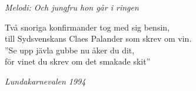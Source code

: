 {\footnotesize\textit{Melodi: Och jungfru hon går i ringen}}\par
\vspace{10pt}
Två snoriga konfirmander tog med sig bensin,\\
till Sydsvenskans Claes Palander som skrev om vin.\\
”Se upp jävla gubbe nu åker du dit,\\
för vinet du skrev om det smakade skit”\par
\vspace{10pt}
{\footnotesize\textit{Lundakarnevalen 1994}}
